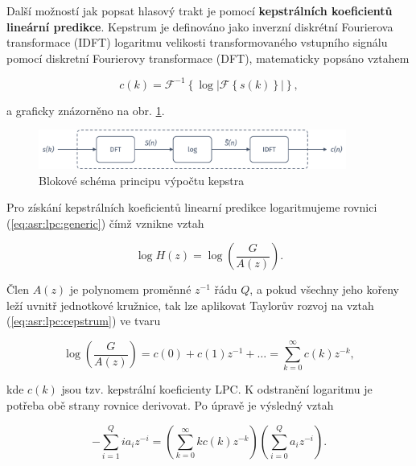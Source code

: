 Další možností jak popsat hlasový trakt je pomocí \textbf{kepstrálních koeficientů lineární predikce}. Kepstrum je definováno jako inverzní diskrétní Fourierova transformace (IDFT) logaritmu velikosti transformovaného vstupního signálu pomocí diskretní Fourierovy transformace (DFT), matematicky popsáno vztahem

\begin{equation}
  c(k) = \mathcal{F}^{-1}\left\{\log\left| \mathcal{F}\left\{s(k)\right\} \right|\right\},
  \label{eq:asr:lpc:cepstrum:generic}
\end{equation}

\noindent a graficky znázorněno na obr. \ref{fig:asr:model:speech:cepstrum}.

\begin{figure}[hbpt]
  \centering
  \includegraphics[width=0.9\textwidth]{./ch4-asr/img/cepstrum.pdf}
  \caption{Blokové schéma principu výpočtu kepstra}
  \label{fig:asr:model:speech:cepstrum}
\end{figure}

Pro získání kepstrálních koeficientů linearní predikce logaritmujeme rovnici (\ref{eq:asr:lpc:generic}) čímž vznikne vztah

\begin{equation}
  \log H(z) = \log \left( \frac{G}{A(z)} \right).
  \label{eq:asr:lpc:cepstrum}
\end{equation}

\noindent Člen $A(z)$ je polynomem proměnné $z^{-1}$ řádu $Q$, a pokud všechny jeho kořeny leží uvnitř jednotkové kružnice, tak lze aplikovat Taylorův rozvoj na vztah (\ref{eq:asr:lpc:cepstrum}) ve tvaru

\begin{equation}
  \log \left( \frac{G}{A(z)} \right) = c(0) + c(1)z^{-1} + \dots = \sum_{k=0}^{\infty} c(k)z^{-k},
  \label{eq:asr:lpc:cepstrum:taylor}
\end{equation}

\noindent kde $c(k)$ jsou tzv. kepstrální koeficienty LPC. K odstranění logaritmu je potřeba obě strany rovnice derivovat. Po úpravě je výsledný vztah

\begin{equation}
  - \sum_{i=1}^{Q} ia_iz^{-i} = \left( \sum_{k=0}^{\infty} kc(k)z^{-k} \right)\left( \sum_{i=0}^{Q} a_iz^{-i}\right).
  \label{eq:asr:lpc:cepstrum:deriv}
\end{equation}

